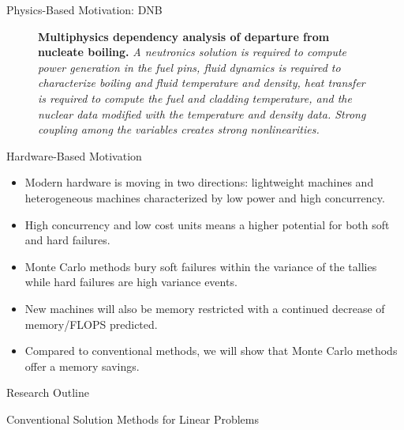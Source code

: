 \documentclass{beamer}
\begin{document}
\begin{frame}{Physics-Based Motivation: DNB}
  \begin{figure}[htpb!]
    \begin{center}
      \scalebox{1}{  }
    \end{center}
    \caption{\textbf{Multiphysics dependency analysis of departure from
        nucleate boiling.} \textit{A neutronics solution is required to
        compute power generation in the fuel pins, fluid dynamics is
        required to characterize boiling and fluid temperature and
        density, heat transfer is required to compute the fuel and
        cladding temperature, and the nuclear data modified with the
        temperature and density data. Strong coupling among the
        variables creates strong nonlinearities.}}
    \label{fig:dnb_example}
  \end{figure}
\end{frame}

\begin{frame}{Hardware-Based Motivation}
  \begin{itemize}
    \item Modern hardware is moving in two directions: lightweight
      machines and heterogeneous machines characterized by low power
      and high concurrency.
    \item High concurrency and low cost units means a higher potential
      for both soft and hard failures.
    \item Monte Carlo methods bury soft failures within the variance
      of the tallies while hard failures are high variance events.
    \item New machines will also be memory restricted with a continued
      decrease of memory/FLOPS predicted.
    \item Compared to conventional methods, we will show that Monte
      Carlo methods offer a memory savings.
  \end{itemize}
\end{frame}

\begin{frame}{Research Outline}

\end{frame}

\begin{frame}{Conventional Solution Methods for Linear Problems}

\end{frame}
\end{document}
